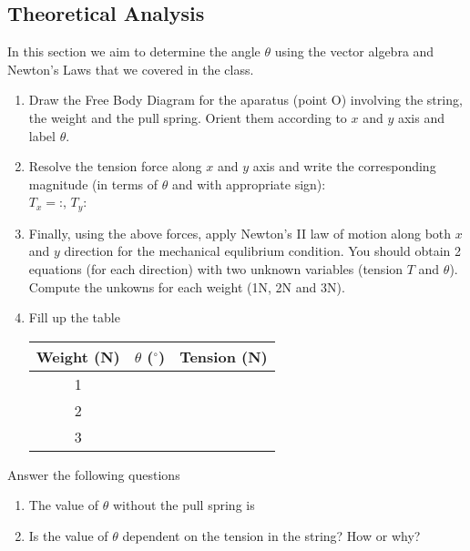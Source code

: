 \documentclass[10pt]{article}
\begin{document}
\subsection{Theoretical Analysis}
In this section we aim to determine the angle $\theta$ using the vector algebra and Newton's Laws that we covered in the class.
\begin{enumerate}
\item Draw the Free Body Diagram for the aparatus (point O) involving the string, the weight and the pull spring.  Orient them according to $x$ and $y$ axis and label $\theta$.
\vspace{250px}
\item Resolve the tension force along $x$ and $y$ axis and write the corresponding magnitude (in terms of $\theta$ and with appropriate sign):\\
$T_x=$:\underline{\hspace{5cm}}, $T_y$:\underline{\hspace{5cm}}
\item Finally, using the above forces, apply Newton's II law of motion along both $x$ and $y$ direction for the mechanical equlibrium condition.  You should obtain 2 equations (for each direction) with two unknown variables (tension $T$ and $\theta$).  Compute the unkowns for each weight (1N, 2N and 3N).
\vspace{500px}
\item Fill up the table
\begin{center}
 \begin{tabular}{||c c c||} 
 \hline
 Weight (N) & $\theta$ ($^{\circ}$) & Tension (N)\\ [0.5ex] 
 \hline\hline
 1 &  & \\ 
 \hline
 2 &  &\\
\hline
 3 & &\\
\hline
\end{tabular}
\end{center}
\end{enumerate}
Answer the following questions
\begin{enumerate}
\item The value of $\theta$ without the pull spring is \underline{\hspace{3cm}}
\item Is the value of $\theta$ dependent on the tension in the string? How or why?
\end{enumerate}
\end{document}
